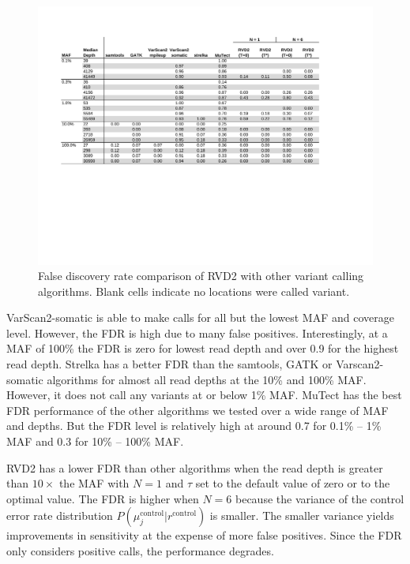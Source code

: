 \documentclass{bioinfo}
\begin{document}
\begin{figure}[!tpb]
\begin{center}
\includegraphics[width=1\textwidth]{pdf_figs/comparison_table_fdr.pdf}
\caption{False discovery rate comparison of RVD2 with other variant calling algorithms. Blank cells indicate no locations were called variant.}
\label{tbl:comparison_fdr}
\end{center}
\end{figure}

VarScan2-somatic is able to make calls for all but the lowest MAF and coverage level. However, the FDR is high due to many false positives. Interestingly, at a MAF of 100\% the FDR is zero for lowest read depth and over 0.9 for the highest read depth. Strelka has a better FDR than the samtools, GATK or Varscan2-somatic algorithms for almost all read depths at the 10\% and 100\% MAF. However, it does not call any variants at or below 1\% MAF.  MuTect has the best FDR performance of the other algorithms we tested over a wide range of MAF and depths. But the FDR level is relatively high at around 0.7 for 0.1\% -- 1\% MAF and 0.3 for 10\% -- 100\% MAF.

RVD2 has a lower FDR than other algorithms when the read depth is greater than $10\times$ the MAF with $N=1$ and $\tau$ set to the default value of zero or to the optimal value. The FDR is higher when $N=6$ because the variance of the control error rate distribution $P(\mu_j^{\text{control}} | r^{\text{control}})$ is smaller. The smaller variance yields improvements in sensitivity at the expense of more false positives. Since the FDR only considers positive calls, the performance degrades.
\end{document}
